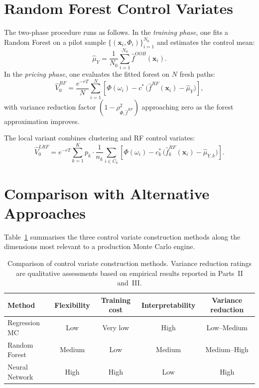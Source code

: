 \documentclass[12pt, a4paper]{report}
\theoremstyle{definition}
\begin{document}
\section{Random Forest Control Variates}
\label{sec:rf-cv}

The two-phase procedure runs as follows.  In the \emph{training phase},
one fits a Random Forest on a pilot sample $\{(\mathbf{x}_i,
\Phi_i)\}_{i=1}^{N_0}$ and estimates the control mean:
\begin{equation}
    \hat{\mu}_Y = \frac{1}{N_0}\sum_{i=1}^{N_0}
    \hat{f}^{OOB}(\mathbf{x}_i).
    \label{eq:rf-control-mean}
\end{equation}
In the \emph{pricing phase}, one evaluates the fitted forest on $N$
fresh paths:
\begin{equation}
    \hat{V}_0^{RF} = \frac{e^{-rT}}{N}\sum_{i=1}^{N}
    \left[\Phi(\omega_i) - c^*\,
    \bigl(\hat{f}^{RF}(\mathbf{x}_i) - \hat{\mu}_Y\bigr)\right],
    \label{eq:rf-cv-estimator}
\end{equation}
with variance reduction factor $(1 - \rho^2_{\Phi,\hat{f}^{RF}})$
approaching zero as the forest approximation improves.

The local variant combines clustering and RF control variates:
\begin{equation}
    \hat{V}_0^{LRF} = e^{-rT}\sum_{k=1}^{K} p_k \cdot
    \frac{1}{n_k}\sum_{i \in C_k}
    \left[\Phi(\omega_i) - c_k^*\,
    \bigl(\hat{f}_k^{RF}(\mathbf{x}_i) - \hat{\mu}_{Y,k}\bigr)\right].
    \label{eq:rf-local-estimator}
\end{equation}

\section{Comparison with Alternative Approaches}
\label{sec:rf-comparison}

Table~\ref{tab:method-comparison} summarises the three control variate
construction methods along the dimensions most relevant to a production
Monte Carlo engine.

\begin{table}[H]
\centering
\caption{Comparison of control variate construction methods.  Variance
         reduction ratings are qualitative assessments based on empirical
         results reported in Parts~II and~III.}
\label{tab:method-comparison}
\renewcommand{\arraystretch}{1.5}
\begin{tabular}{lcccc}
\toprule
\textbf{Method} & \textbf{Flexibility}
                & \textbf{Training cost}
                & \textbf{Interpretability}
                & \textbf{Variance reduction} \\
\midrule
Regression MC    & Low    & Very low  & High   & Low--Medium \\
Random Forest    & Medium & Low       & Medium & Medium--High \\
Neural Network   & High   & High      & Low    & High \\
\bottomrule
\end{tabular}
\end{table}
\end{document}
